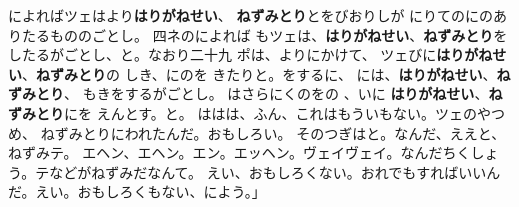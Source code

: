 \documentclass[
    a4paper,
    10pt,
    book]
    {tarticle}
\begin{document}
\newpage
\thispagestyle{fancy}
によればツェはより\textbf{はりがねせい}、
\textbf{ねずみとり}とをびおりしが
にりてのにのありたるもののごとし。
四ネのによれば
もツェは、\textbf{はりがねせい}、\textbf{ねずみとり}を
したるがごとし、と。なおり二十九
ポは、よりにかけて、
ツェびに\textbf{はりがねせい}、\textbf{ねずみとり}の
しき、にのを
きたりと。をするに、
には、\textbf{はりがねせい}、\textbf{ねずみとり}、
もきをするがごとし。
はさらにくのをの
、いに
\textbf{はりがねせい}、\textbf{ねずみとり}にを
えんとす。と。
ははは、ふん、これはもういもない。ツェのやつめ、
ねずみとりにわれたんだ。おもしろい。
そのつぎはと。なんだ、ええと、ねずみテ。
エヘン、エヘン。エン。エッヘン。ヴェイヴェイ。なんだちくしょう。テなどがねずみだなんて。
えい、おもしろくない。おれでもすればいいんだ。えい。おもしろくもない、によう。」
\begin{comment}
\end{comment}
\end{document}
